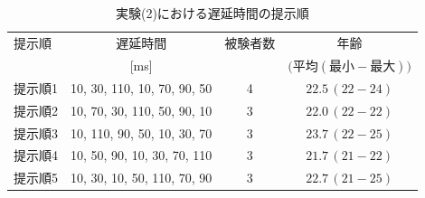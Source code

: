 \begin{table}[tbp]
  \caption{実験(2)における遅延時間の提示順}
  \label{table:B_delay_time}
  \centering
  \begin{tabular}{lccc}
    \hline
    提示順 & 遅延時間 & 被験者数 & 年齢\\
    　& [ms] & & $\bigl(平均 (最小-最大)\bigr)$\\
    \hline \hline
    提示順1  & 10, 30, 110, 10, 70, 90, 50  & 4 & $22.5\, (22-24)$\\
    提示順2  & 10, 70, 30, 110, 50, 90, 10  & 3 & $22.0\, (22-22)$\\
    提示順3  & 10, 110, 90, 50, 10, 30, 70  & 3 & $23.7\, (22-25)$\\
    提示順4  & 10, 50, 90, 10, 30, 70, 110  & 3 & $21.7\, (21-22)$\\
    提示順5  & 10, 30, 10, 50, 110, 70, 90  & 3 & $22.7\, (21-25)$
\\
    \hline
  \end{tabular}
\end{table}
